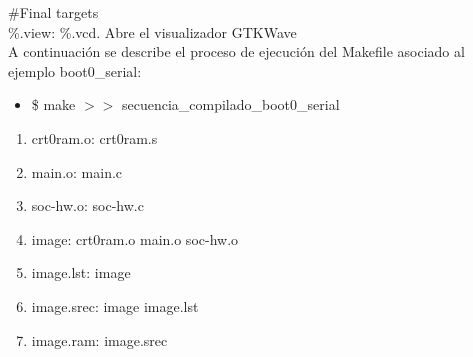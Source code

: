 \documentclass[twocolumn]{IEEEtran}
\begin{document}
\noindent
\#Final targets\\
\%.view: \%.vcd. Abre el visualizador GTKWave\\
A continuación se describe el proceso de ejecución del Makefile asociado al ejemplo boot0\_serial:
\begin{itemize}
 \item \$ make $>>$ secuencia\_compilado\_boot0\_serial
\end{itemize}
\begin{enumerate}
 \item crt0ram.o: crt0ram.s
 \item main.o: main.c
 \item soc-hw.o: soc-hw.c
 \item image: crt0ram.o main.o soc-hw.o
 \item image.lst: image
 \item image.srec: image image.lst
 \item image.ram: image.srec
\end{enumerate}
\end{document}
